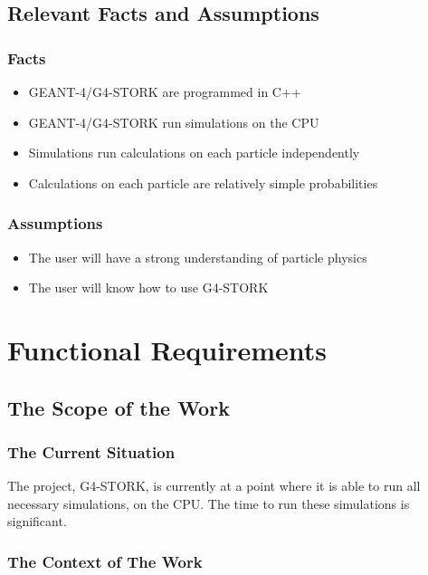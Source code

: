 \documentclass[12pt]{article}
\begin{document}
\subsection{Relevant Facts and Assumptions} %
\subsubsection{Facts}
\begin{itemize}
\item GEANT-4/G4-STORK are programmed in C++
\item GEANT-4/G4-STORK run simulations on the CPU
\item Simulations run calculations on each particle independently
\item Calculations on each particle are relatively simple probabilities
\end{itemize}

\subsubsection{Assumptions}
\begin{itemize}
\item The user will have a strong understanding of particle physics
\item The user will know how to use G4-STORK
\end{itemize}

\section{Functional Requirements}

\subsection{The Scope of the Work} %
\subsubsection{The Current Situation}
The project, G4-STORK, is currently at a point where it is able to run all necessary simulations, on the CPU. The time to run these simulations is significant.

\subsubsection{The Context of The Work}
\end{document}
